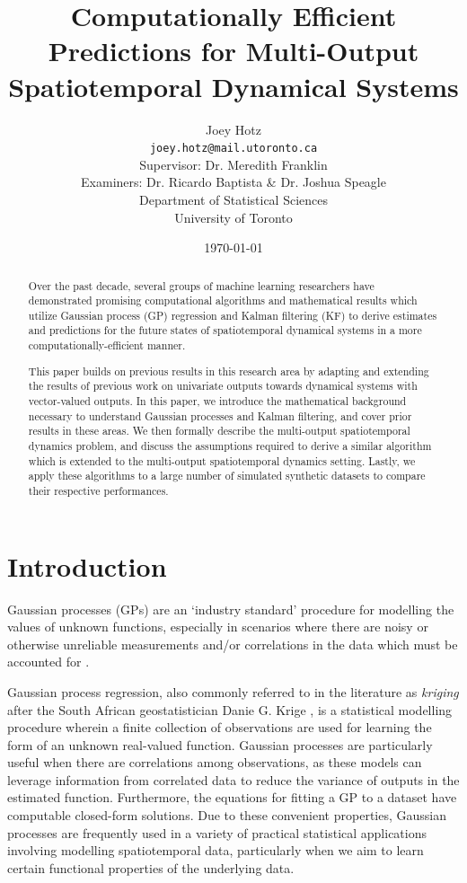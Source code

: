 \documentclass[10pt]{article}
\title{\textbf{Computationally Efficient Predictions for Multi-Output Spatiotemporal Dynamical Systems}} %
\author{
    Joey Hotz \\ \vspace{-0.3cm}\normalsize\texttt{joey.hotz@mail.utoronto.ca}\\ %
    \large
    \vspace{0.5cm}
    Supervisor: Dr. Meredith Franklin \\ %

    Examiners: Dr. Ricardo Baptista \& Dr. Joshua Speagle

    \vspace{0.5cm}
    Department of Statistical Sciences \\
    University of Toronto
}
\date{\today}
\numberwithin{equation}{section}
\begin{document}
\graphicspath{
    {../Code/results/full}
}

\maketitle
\thispagestyle{empty}

\begin{abstract}
    Over the past decade, several groups of machine learning researchers have demonstrated promising computational algorithms and mathematical results which utilize Gaussian process (GP) regression and Kalman filtering (KF) to derive estimates and predictions for the future states of spatiotemporal dynamical systems in a more computationally-efficient manner.
    
    This paper builds on previous results in this research area by adapting and extending the results of previous work on univariate outputs towards dynamical systems with vector-valued outputs. In this paper, we introduce the mathematical background necessary to understand Gaussian processes and Kalman filtering, and cover prior results in these areas. We then formally describe the multi-output spatiotemporal dynamics problem, and discuss the assumptions required to derive a similar algorithm which is extended to the multi-output spatiotemporal dynamics setting. Lastly, we apply these algorithms to a large number of simulated synthetic datasets to compare their respective performances.
\end{abstract}

\clearpage

\tableofcontents

\newpage

\setcounter{page}{1}

\section{Introduction}
\label{sec:intro}

Gaussian processes (GPs) are an `industry standard' procedure for modelling the values of unknown functions, especially in scenarios where there are noisy or otherwise unreliable measurements and/or correlations in the data which must be accounted for \citep{GPML-Book-2006}. 

Gaussian process regression, also commonly referred to in the literature as \emph{kriging} after the South African geostatistician Danie G. Krige \citep{Cressie-Origins-1990}, is a statistical modelling procedure wherein a finite collection of observations are used for learning the form of an unknown real-valued function. Gaussian processes are particularly useful when there are correlations among observations, as these models can leverage information from correlated data to reduce the variance of outputs in the estimated function. Furthermore, the equations for fitting a GP to a dataset have computable closed-form solutions. Due to these convenient properties, Gaussian processes are frequently used in a variety of practical statistical applications involving modelling spatiotemporal data, particularly when we aim to learn certain functional properties of the underlying data.
\end{document}
